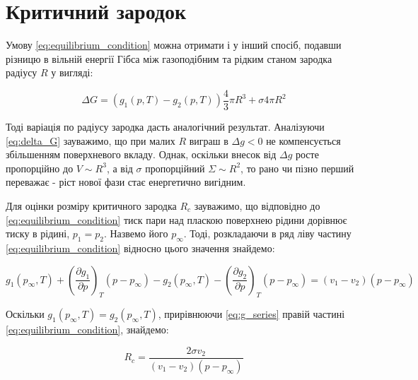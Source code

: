 \section{Критичний зародок}

Умову \eqref{eq:equilibrium_condition} можна отримати і у інший спосіб, подавши різницю в вільній
енергії Гібса між газоподібним та рідким станом зародка радіусу $R$ у вигляді:

\begin{equation}\label{eq:delta_G}
\Delta G = \left( g_1(p,T) - g_2(p,T) \right)\frac{4}{3}\pi R^3 + \sigma 4\pi R^2
\end{equation}

Тоді варіація по радіусу зародка дасть аналогічний результат. Аналізуючи \eqref{eq:delta_G} зауважимо,
що при малих $R$ виграш в $\Delta g<0$ не компенсується збільшенням поверхневого вкладу. Однак,
оскільки внесок від $\Delta g$ росте пропорційно до $V\sim R^3$, а від $\sigma$ пропорційний
$\Sigma\sim R^2$, то рано чи пізно перший переважає - ріст нової фази стає енергетично вигідним.

Для оцінки розміру критичного зародка $R_c$ зауважимо, що відповідно до
\eqref{eq:equilibrium_condition} тиск пари над пласкою поверхнею рідини дорівнює тиску в рідині,
$p_1=p_2$. Назвемо його $p_\infty$. Тоді, розкладаючи в ряд ліву частину
\eqref{eq:equilibrium_condition} відносно цього значення знайдемо:

\begin{equation}\label{eq:g_series}
g_1\left( p_{\infty},T \right) + \left( \frac{\partial g_1}{\partial p} \right)_T\left( p - p_{\infty}
\right) - g_2\left( p_{\infty},T \right) - \left( \frac{\partial g_2}{\partial p} \right)_T\left( p -
p_{\infty} \right) = \left( v_1 - v_2 \right)\left( p - p_{\infty} \right)
\end{equation}

Оскільки $g_1(p_\infty,T)= g_2(p_\infty,T)$, прирівнюючи \eqref{eq:g_series} правій частині
\eqref{eq:equilibrium_condition}, знайдемо:

\begin{equation}\label{eq:R_critical}
R_c = \frac{2\sigma v_2}{\left( v_1 - v_2 \right)\left( p - p_{\infty} \right)}
\end{equation}


